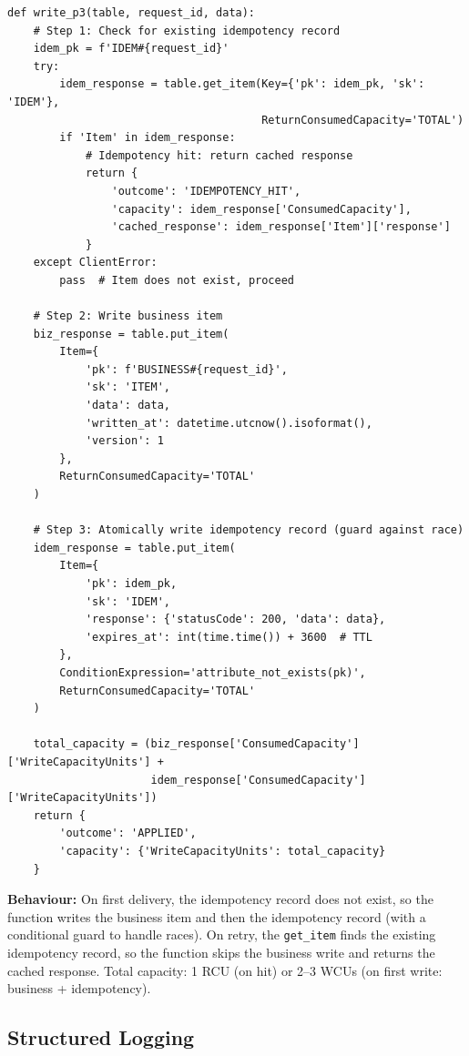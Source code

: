 \begin{verbatim}
def write_p3(table, request_id, data):
    # Step 1: Check for existing idempotency record
    idem_pk = f'IDEM#{request_id}'
    try:
        idem_response = table.get_item(Key={'pk': idem_pk, 'sk': 'IDEM'},
                                       ReturnConsumedCapacity='TOTAL')
        if 'Item' in idem_response:
            # Idempotency hit: return cached response
            return {
                'outcome': 'IDEMPOTENCY_HIT',
                'capacity': idem_response['ConsumedCapacity'],
                'cached_response': idem_response['Item']['response']
            }
    except ClientError:
        pass  # Item does not exist, proceed

    # Step 2: Write business item
    biz_response = table.put_item(
        Item={
            'pk': f'BUSINESS#{request_id}',
            'sk': 'ITEM',
            'data': data,
            'written_at': datetime.utcnow().isoformat(),
            'version': 1
        },
        ReturnConsumedCapacity='TOTAL'
    )

    # Step 3: Atomically write idempotency record (guard against race)
    idem_response = table.put_item(
        Item={
            'pk': idem_pk,
            'sk': 'IDEM',
            'response': {'statusCode': 200, 'data': data},
            'expires_at': int(time.time()) + 3600  # TTL
        },
        ConditionExpression='attribute_not_exists(pk)',
        ReturnConsumedCapacity='TOTAL'
    )

    total_capacity = (biz_response['ConsumedCapacity']['WriteCapacityUnits'] +
                      idem_response['ConsumedCapacity']['WriteCapacityUnits'])
    return {
        'outcome': 'APPLIED',
        'capacity': {'WriteCapacityUnits': total_capacity}
    }
\end{verbatim}

\textbf{Behaviour:} On first delivery, the idempotency record does not exist, so the function writes the business item and then the idempotency record (with a conditional guard to handle races). On retry, the \texttt{get\_item} finds the existing idempotency record, so the function skips the business write and returns the cached response. Total capacity: 1 RCU (on hit) or 2--3 WCUs (on first write: business + idempotency).

\subsection{Structured Logging}

